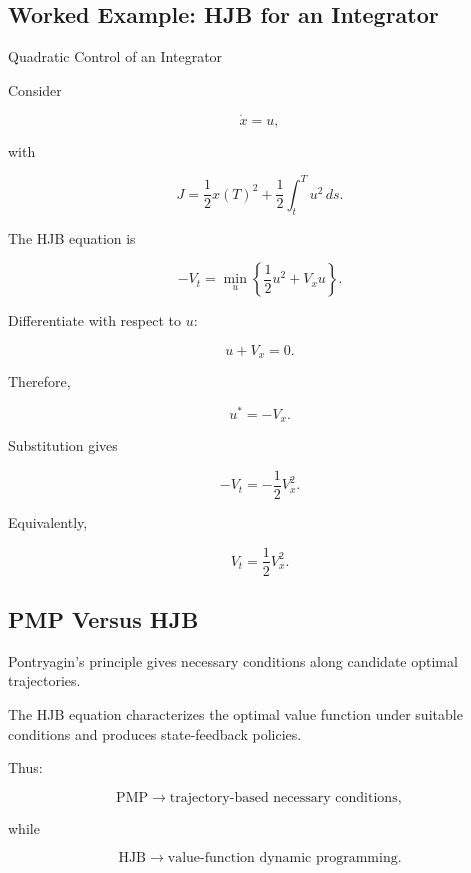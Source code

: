 \subsection{Worked Example: HJB for an Integrator}
\label{subsec:worked-hjb-integrator}

\begin{workedexamplebox}{Quadratic Control of an Integrator}

Consider

\[
\dot{x}=u,
\]

with

\[
J
=
\frac12x(T)^2
+
\frac12
\int_t^T
u^2\,ds.
\]

The HJB equation is

\[
-V_t
=
\min_u
\left\{
\frac12u^2
+
V_xu
\right\}.
\]

Differentiate with respect to \(u\):

\[
u+V_x=0.
\]

Therefore,

\begin{answerbox}
\[
\boxed{
u^*
=
-V_x.
}
\]
\end{answerbox}

Substitution gives

\[
\boxed{
-V_t
=
-\frac12V_x^2.
}
\]

Equivalently,

\[
\boxed{
V_t
=
\frac12V_x^2.
}
\]

\end{workedexamplebox}

\subsection{PMP Versus HJB}
\label{subsec:pmp-versus-hjb}

Pontryagin's principle gives necessary conditions along candidate optimal
trajectories.

The HJB equation characterizes the optimal value function under suitable
conditions and produces state-feedback policies.

Thus:

\[
\boxed{
\text{PMP}
\rightarrow
\text{trajectory-based necessary conditions},
}
\]

while

\[
\boxed{
\text{HJB}
\rightarrow
\text{value-function dynamic programming}.
}
\]

